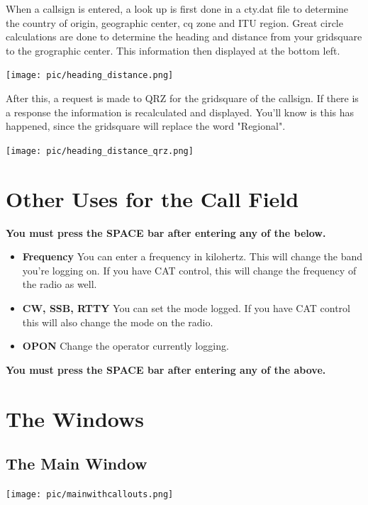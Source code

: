 \documentclass{article}
\begin{document}
When a callsign is entered, a look up is first done in a cty.dat file to determine the country of origin, geographic center, cq zone and ITU region. Great circle calculations are done to determine the heading and distance from your gridsquare to the grographic center. This information then displayed at the bottom left.

\vspace{0.5cm}
\texttt{[image: pic/heading\_distance.png]}
\vspace{0.5cm}

After this, a request is made to QRZ for the gridsquare of the callsign. If there is a response the information is recalculated and displayed. You'll know is this has happened, since the gridsquare will replace the word "Regional".

\vspace{0.5cm}
\texttt{[image: pic/heading\_distance\_qrz.png]}
\vspace{0.5cm}

\section{Other Uses for the Call Field}

\textbf{You must press the SPACE bar after entering any of the below.}
\begin{itemize}
\item \textbf{Frequency} You can enter a frequency in kilohertz. This will change the band you're logging on. If you have CAT control, this will change the frequency of the radio as well.
\item \textbf{CW, SSB, RTTY} You can set the mode logged. If you have CAT control this will also change the mode on the radio.
\item \textbf{OPON} Change the operator currently logging.
\end{itemize}

\textbf{You must press the SPACE bar after entering any of the above.}

\section{The Windows}

\subsection{The Main Window}

\vspace{0.5cm}
\texttt{[image: pic/mainwithcallouts.png]}
\vspace{0.5cm}
\end{document}
